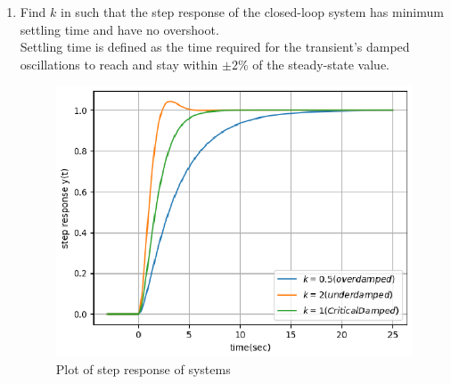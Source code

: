 \begin{enumerate}[label=\thesubsection.\arabic*.,ref=\thesubsection.\theenumi]
\item  Find $k$ in  such that the step response of the closed-loop system has minimum settling time and have no overshoot.\\
\solution Settling time is defined as the time required for the transient's damped oscillations to
reach and stay within $\pm 2$\% of the steady-state value.\\
\begin{figure}[!h]
\includegraphics[width=\columnwidth]{./figures/ee18btech11035_4.eps}
\caption{Plot of step response of systems}
\label{fig:ee18btech11035_y(t)}
\end{figure}


\end{enumerate}
